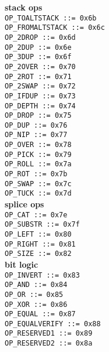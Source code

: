 \documentclass{article}
\begin{document}
\begin{multicols}{3}
\textbf{\centering stack ops} \\
\texttt{OP\_TOALTSTACK ::= 0x6b  } \\
\texttt{OP\_FROMALTSTACK ::= 0x6c  } \\
\texttt{OP\_2DROP ::= 0x6d  } \\
\texttt{OP\_2DUP ::= 0x6e  } \\
\texttt{OP\_3DUP ::= 0x6f  } \\
\texttt{OP\_2OVER ::= 0x70  } \\
\texttt{OP\_2ROT ::= 0x71  } \\
\texttt{OP\_2SWAP ::= 0x72  } \\
\texttt{OP\_IFDUP ::= 0x73  } \\
\texttt{OP\_DEPTH ::= 0x74  } \\
\texttt{OP\_DROP ::= 0x75  } \\
\texttt{OP\_DUP ::= 0x76  } \\
\texttt{OP\_NIP ::= 0x77  } \\
\texttt{OP\_OVER ::= 0x78  } \\
\texttt{OP\_PICK ::= 0x79  } \\
\texttt{OP\_ROLL ::= 0x7a  } \\
\texttt{OP\_ROT ::= 0x7b  } \\
\texttt{OP\_SWAP ::= 0x7c  } \\
\texttt{OP\_TUCK ::= 0x7d  } \\

\textbf{\centering splice ops} \\
\texttt{OP\_CAT ::= 0x7e  } \\
\texttt{OP\_SUBSTR ::= 0x7f  } \\
\texttt{OP\_LEFT ::= 0x80  } \\
\texttt{OP\_RIGHT ::= 0x81  } \\
\texttt{OP\_SIZE ::= 0x82  } \\

\textbf{\centering bit logic} \\
\texttt{OP\_INVERT ::= 0x83  } \\
\texttt{OP\_AND ::= 0x84  } \\
\texttt{OP\_OR ::= 0x85  } \\
\texttt{OP\_XOR ::= 0x86  } \\
\texttt{OP\_EQUAL ::= 0x87  } \\
\texttt{OP\_EQUALVERIFY ::= 0x88  } \\
\texttt{OP\_RESERVED1 ::= 0x89  } \\
\texttt{OP\_RESERVED2 ::= 0x8a  } \\


\end{multicols}
\end{document}
